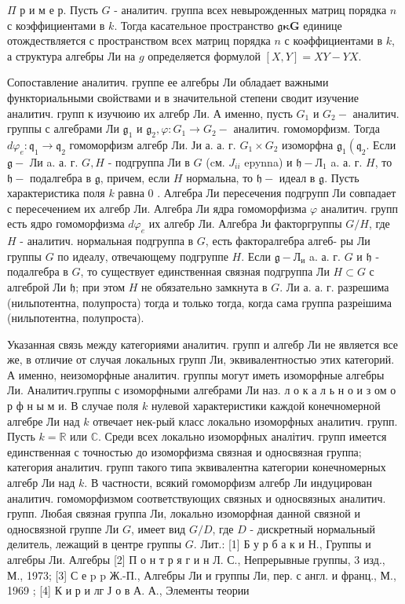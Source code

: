\documentclass[10pt]{article}
\begin{document}
$\Pi$ р и м е р. Пусть $G$ - аналитич. группа всех невырожденных матриц порядка $n$ с коэффициентами в $k$. Тогда касательное пространство $\mathfrak{g} \boldsymbol{\kappa} \boldsymbol{G}$ единице отождествляется с пространством всех матриц порядка $n$ с коәффициентами в $k$, а структура алгебры Ли на $g$ определяется формулой $[X, Y]=X Y-Y X$.



Сопоставление аналитич. группе ее алгебры Ли обладает важными функториальными свойствами и в значительной степени сводит изучение аналитич. групп к изучюию их алгебр Ли. А именно, пусть $G_{1}$ и $G_{2}-$ аналитич. группы с алгебрами Ли $\mathfrak{g}_{1}$ и $\mathfrak{g}_{2}, \varphi: G_{1} \rightarrow G_{2}-$ аналитич. гомоморфизм. Тогда $d \varphi_{e}: \mathfrak{q}_{1} \rightarrow \mathfrak{q}_{2}$ гомоморфизм алгебр Ли. Ји а. а. г. $G_{1} \times G_{2}$ изоморфна $\mathfrak{g}_{1}\left(\mathfrak{q}_{2}\right.$. Если $\mathfrak{g}-$ Ли a. а. г. $G, H$ - подгруппа Ли в $G$ (cм. $J_{i i}$ epynna) и $\mathfrak{h}-Л_{1}$ a. а. г. $H$, то $\mathfrak{h}-$ подалгебра в $\mathfrak{g}$, причем, если $H$ нормальна, то $\mathfrak{h}-$ идеал в $\mathfrak{g}$. Пусть характеристика поля $k$ равна 0 . Алгебра Ли пересечения подгрупп Ли совпадает с пересечением их алгебр Ли. Алгебра Ли ядра гомоморфизма $\varphi$ аналитич. групп есть ядро гомоморфизма $d \varphi_{e}$ их алгебр Ли. Алгебра Ји факторгруппы $G / H$, где $H$ - аналитич. нормальная подгруппа в $G$, есть факторалгебра алгеб- ры Ли группы $G$ по идеалу, отвечающему подгруппе $H$. Если $\mathfrak{g}-Л_{и}$ a. а. г. $G$ и $\mathfrak{h}$ - подалгебра в $G$, то существует единственная связная подгруппа Ли $H \subset G$ с алгеброй Ли $\mathfrak{h}$; при этом $H$ не обязательно замкнута в $G$. Ли а. а. г. разрешима (нильпотентна, полупроста) тогда и только тогда, когда сама группа разреішима (нильпотентна, полупроста).



Указанная связь между категориями аналитич. групп и алгебр Ли не является все же, в отличие от случая локальных групп Ли, эквивалентностью этих категорий. А именно, неизоморфные аналитич. группы могут иметь изоморфные алгебры Ли. Аналитич.группы с изоморфными алгебрами Ли наз. л о к а л ь н о и з ом о р ф н ы м и. В случае поля $k$ нулевой характеристики каждой конечномерной алгебре Ли над $k$ отвечает нек-рый класс локально изоморфных аналитич. групп. Пусть $k=\mathbb{R}$ или $\mathbb{C}$. Среди всех локально изоморфных аналітич. групп имеется единственная с точностью до изоморфизма связная и односвязная группа; категория аналитич. групп такого типа эквивалентна категории конечномерных алгебр Ли над $k$. В частности, всякий гомоморфизм алгебр Ли индуцирован аналитич. гомоморфизмом соответствующих связных и односвязных аналитич. групп. Любая связная группа Ли, локально изоморфная данной связной и односвязной группе Ли $G$, имеет вид $G / D$, где $D$ - дискретный нормальный делитель, лежащий в центре группы $G$. Лит.: [1] Б у р б а к и Н., Группы и алгебры Ли. Алгебры [2] П о н т р я г и н Л. С., Непрерывные группы, 3 изд., М., 1973; [3] С е p p Ж.-П., Алгебры Ли и группы Ли, пер. с англ. и франц., М., 1969 ; [4] К и р и лг Ј о в А. А., Элементы теории
\end{document}
